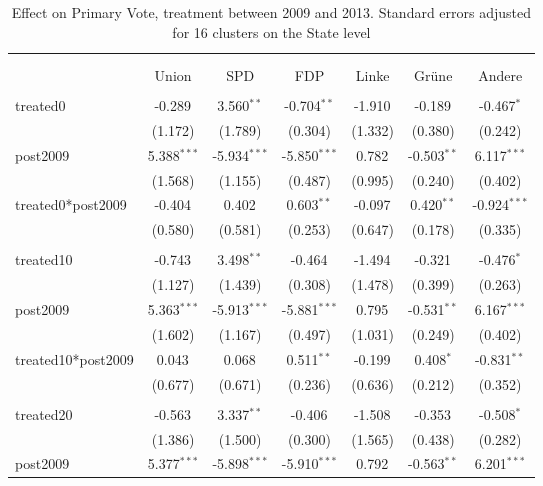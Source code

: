 \documentclass[12pt]{article}
\begin{document}
 
\begin{table}[!htbp] \centering
  \caption{Effect on Primary Vote, treatment between 2009 and 2013. Standard errors adjusted for 16 clusters on the State level}
\begin{tabular}{@{\extracolsep{5pt}}lcccccc}
\\[-1.8ex]\hline
\hline \\[-1.8ex]
\\[-1.8ex] & \multicolumn{1}{c}{Union} & \multicolumn{1}{c}{SPD} & \multicolumn{1}{c}{FDP} & \multicolumn{1}{c}{Linke} & \multicolumn{1}{c}{Grüne} & \multicolumn{1}{c}{Andere}  \\
\hline \\[-1.8ex]
 treated0 & -0.289$^{}$ & 3.560$^{**}$ & -0.704$^{**}$ & -1.910$^{}$ & -0.189$^{}$ & -0.467$^{*}$ \\
  & (1.172) & (1.789) & (0.304) & (1.332) & (0.380) & (0.242) \\
 post2009 & 5.388$^{***}$ & -5.934$^{***}$ & -5.850$^{***}$ & 0.782$^{}$ & -0.503$^{**}$ & 6.117$^{***}$ \\
  & (1.568) & (1.155) & (0.487) & (0.995) & (0.240) & (0.402) \\
 treated0*post2009 & -0.404$^{}$ & 0.402$^{}$ & 0.603$^{**}$ & -0.097$^{}$ & 0.420$^{**}$ & -0.924$^{***}$ \\
  & (0.580) & (0.581) & (0.253) & (0.647) & (0.178) & (0.335) \\
\hline \\[-1.8ex]
 treated10 & -0.743$^{}$ & 3.498$^{**}$ & -0.464$^{}$ & -1.494$^{}$ & -0.321$^{}$ & -0.476$^{*}$ \\
  & (1.127) & (1.439) & (0.308) & (1.478) & (0.399) & (0.263) \\
 post2009 & 5.363$^{***}$ & -5.913$^{***}$ & -5.881$^{***}$ & 0.795$^{}$ & -0.531$^{**}$ & 6.167$^{***}$ \\
  & (1.602) & (1.167) & (0.497) & (1.031) & (0.249) & (0.402) \\
 treated10*post2009 & 0.043$^{}$ & 0.068$^{}$ & 0.511$^{**}$ & -0.199$^{}$ & 0.408$^{*}$ & -0.831$^{**}$ \\
  & (0.677) & (0.671) & (0.236) & (0.636) & (0.212) & (0.352) \\
\hline \\[-1.8ex]
 treated20 & -0.563$^{}$ & 3.337$^{**}$ & -0.406$^{}$ & -1.508$^{}$ & -0.353$^{}$ & -0.508$^{*}$ \\
  & (1.386) & (1.500) & (0.300) & (1.565) & (0.438) & (0.282) \\
 post2009 & 5.377$^{***}$ & -5.898$^{***}$ & -5.910$^{***}$ & 0.792$^{}$ & -0.563$^{**}$ & 6.201$^{***}$ \\

\end{tabular}
\end{table}
\end{document}
